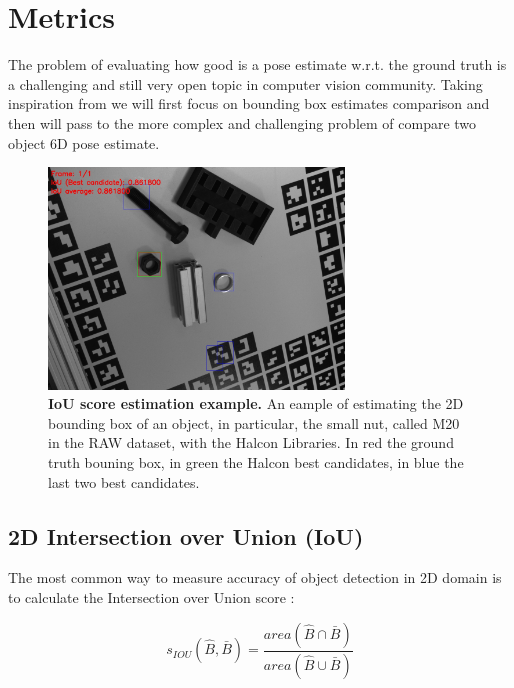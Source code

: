 \section{Metrics}\label{sec:metrics}
The problem of evaluating how good is a pose estimate w.r.t. the ground truth is a challenging and still very open topic in computer vision community.  Taking inspiration from \cite{hodan20166DPoseEstimation} we will first focus on bounding box estimates comparison and then will pass to the more complex and challenging problem of compare two object 6D pose estimate.

\begin{figure}
    \centering
    \includegraphics[width=0.7\textwidth]{figures/2_benchmarks_and_metrics/iou_example}
    \caption{\textbf{IoU score estimation example.} An eample of estimating the 2D bounding box of an object, in particular, the small nut, called M20 in the RAW dataset, with the Halcon Libraries. In red the ground truth bouning box, in green the Halcon best candidates, in blue the last two best candidates.} 
    \label{fig:iou_example}
\end{figure}

\subsection{2D Intersection over Union (IoU)}\label{subsec:iou}
The most common way to measure accuracy of object detection in 2D domain is to calculate the Intersection over Union score \cite{everingham2015challenge}:

\begin{equation}
    \label{eq:iou_score}
    s_{IOU}(\hat{B}, \bar{B}) = \dfrac{area(\hat{B} \cap \bar{B})}{area(\hat{B} \cup \bar{B})}
\end{equation}

